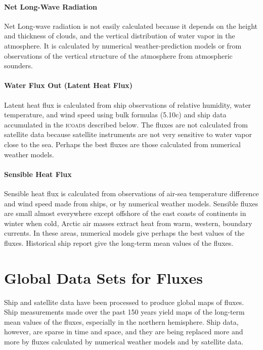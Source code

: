 \paragraph{Net Long-Wave Radiation}
Net
Long-wave radiation is not easily calculated because it depends on the
height and thickness of clouds, and the vertical distribution of water
vapor in the atmosphere. It is calculated by numerical
weather-prediction models or from observations of the vertical
structure of the atmosphere from atmospheric sounders.

\paragraph{Water Flux Out (Latent Heat Flux)}
 Latent heat flux is calculated from ship
observations of relative humidity, water temperature, and wind speed
using bulk formulas (5.10c) and ship data accumulated in the
\textsc{icoads} described below. The fluxes are not
calculated from satellite data because satellite instruments are not
very sensitive to water vapor close to the sea. Perhaps the best
fluxes are those calculated from numerical weather models.

\paragraph{Sensible Heat Flux}
Sensible heat flux is calculated from
observations of air-sea temperature difference and wind speed made
from ships, or by numerical weather models. Sensible fluxes are small
almost everywhere except offshore of the east coasts of continents in
winter when cold, Arctic air masses extract heat from warm, western,
boundary currents. In these areas, numerical models give perhaps the
best values of the fluxes. Historical ship report give the long-term
mean values of the fluxes.

\section{Global Data Sets for Fluxes}
Ship and satellite data have been
processed to produce global maps of fluxes. Ship measurements made
over the past 150 years yield maps of the long-term mean values of the
fluxes, especially in the northern hemisphere. Ship data, however, are
sparse in time and space, and they are being replaced more and more by
fluxes calculated by numerical weather models and by satellite data.

